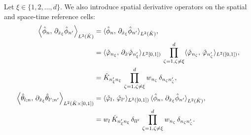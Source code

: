 \documentclass{scrreprt}
\theoremstyle{definition}
\theoremstyle{nonumberplain}
\newcommand{\cell}{K}
\newcommand{\refCell}{\hat{\cell}}
\begin{document}
Let $\xi\in\{1,2,\ldots,d\}$.
We also introduce spatial derivative operators on the spatial and
space-time reference cells:
\begin{align}
\label{eq:ader_impl:operators:stiffness_operator_3d}
\left\langle
\hat{\phi}_{n},\,
\partial_{\hat{x}_\xi}\hat{\phi}_{n'}
\right\rangle
_{L^2(\refCell)}
&=
\langle
\hat{\phi}_{n},\,\partial_{\hat{x}_{\xi}}\hat{\phi}_{n'}
\rangle_{L^2(\refCell)},\notag
\\
&=
\langle
\hat{\varphi}_{n_{\xi}},\,\partial_{\hat{x}}\hat{\varphi}_{n'_{\xi}}
\rangle_{L^2[0,1])}\notag
\,\prod_{\zeta=1,\zeta\neq\xi}^d
\langle \hat{\varphi}_{n_\zeta},\,\hat{\varphi}_{n'_\zeta}\rangle_{L^2([0,1])},
\notag
\\
&=
\hat{K}_{n_\xi'n_\xi }\,
\prod_{\zeta=1,\zeta\neq\xi}^d
w_{n_\zeta}\,
\delta_{n_\zeta n'_\zeta},
\\
\label{eq:ader_impl:operators:stiffness_operator_4d}
\left\langle
\hat{\theta}_{l;n},\,
\partial_{\hat{x}_\xi}\hat{\theta}_{l';n'}
\right\rangle
_{L^2(\refCell\times[0,1])}
&=
\langle
\hat{\varphi}_{l},\,\hat{\varphi}_{l'}
\rangle_{L^2([0,1])}
\,
\langle
\hat{\phi}_{n},\,\partial_{\hat{x}_{\xi}}\hat{\phi}_{n'}
\rangle_{L^2(\refCell)},\notag
\\
&=
w_{l}\,
\hat{K}_{n_\xi'n_\xi }\,
\delta_{ll'}\,
\prod_{\zeta=1,\zeta\neq\xi}^d
w_{n_\zeta}\,
\delta_{n_\zeta n'_\zeta}.
\end{align}
\end{document}
